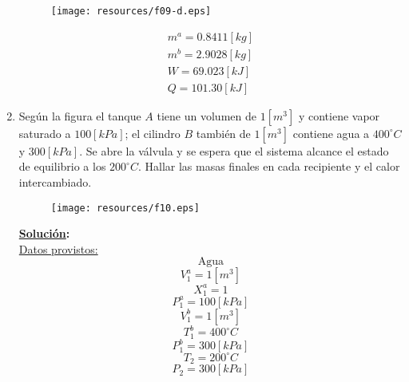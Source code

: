 \documentclass[letter,11pt]{article}
\begin{document}
\begin{enumerate}
\begin{figure}[H]
\centering
\texttt{[image: resources/f09-d.eps]}
\end{figure}

\begin{equation*}
\boxed{
    \begin{array}{l}
        m^a = 0.8411[kg] \\
        m^b = 2.9028[kg] \\
        W = 69.023[kJ] \\
        Q = 101.30[kJ]
    \end{array}
}
\end{equation*}
\newpage

\item Según la figura el tanque $A$ tiene un volumen de $1[m^3]$ y contiene
vapor saturado a $100[kPa]$; el cilindro $B$ también de $1[m^3]$ contiene agua a
$400^\circ C$ y $300[kPa]$. Se abre la válvula y se espera que el sistema
alcance el estado de equilibrio a los $200^\circ C$. Hallar las masas finales en
cada recipiente y el calor intercambiado.

\begin{figure}[H]
\centering
\texttt{[image: resources/f10.eps]}
\end{figure}

\textbf{\underline{Solución}:} \\

\underline{Datos provistos:}
\begin{equation*}
    \text{Agua}
\end{equation*}
\begin{equation*}
    V_1^a = 1[m^3]
\end{equation*}
\begin{equation*}
    X_1^a = 1
\end{equation*}
\begin{equation*}
    P_1^a = 100[kPa]
\end{equation*}
\begin{equation*}
    V_1^b = 1[m^3]
\end{equation*}
\begin{equation*}
    T_1^b = 400^\circ C
\end{equation*}
\begin{equation*}
    P_1^b = 300[kPa]
\end{equation*}
\begin{equation*}
    T_2 = 200^\circ C
\end{equation*}
\begin{equation*}
    P_2 = 300[kPa]
\end{equation*}


\end{enumerate}
\end{document}
